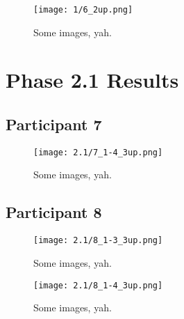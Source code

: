 \clearpage

\begin{figure}[h]
	\begin{center}
	\texttt{[image: 1/6\_2up.png]}
	\caption{Some images, yah.}
	\end{center}
\end{figure}


\clearpage

\section{Phase 2.1 Results}



\clearpage

\subsection{Participant 7}

\begin{figure}[h]
	\begin{center}
	\texttt{[image: 2.1/7\_1-4\_3up.png]}
	\caption{Some images, yah.}
	\end{center}
\end{figure}


\clearpage

\subsection{Participant 8}

\begin{figure}[h]
	\begin{center}
	\texttt{[image: 2.1/8\_1-3\_3up.png]}
	\caption{Some images, yah.}
	\end{center}
\end{figure}

\clearpage

\begin{figure}[h]
	\begin{center}
	\texttt{[image: 2.1/8\_1-4\_3up.png]}
	\caption{Some images, yah.}
	\end{center}
\end{figure}

